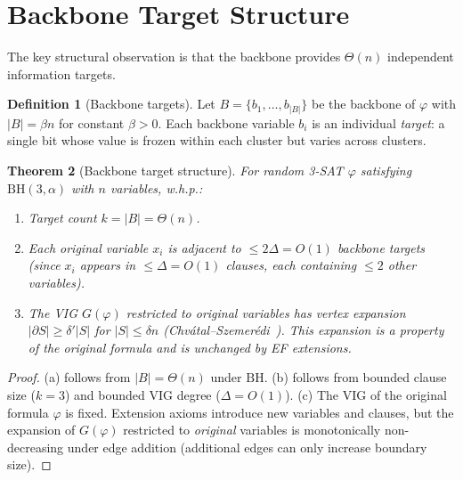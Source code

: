 \documentclass[11pt]{article}
\newtheorem{theorem}{Theorem}[section]
\theoremstyle{definition}
\newtheorem{definition}[theorem]{Definition}
\begin{document}
\section{Backbone Target Structure}\label{sec:targets}

The key structural observation is that the backbone provides
$\Theta(n)$ independent information targets.

\begin{definition}[Backbone targets]\label{def:blocks-sec3}
Let $B = \{b_1, \ldots, b_{|B|}\}$ be the backbone of $\varphi$ with
$|B| = \beta n$ for constant $\beta > 0$.  Each backbone variable
$b_i$ is an individual \emph{target}: a single bit whose value is
frozen within each cluster but varies across clusters.
\end{definition}

\begin{theorem}[Backbone target structure]\label{thm:ldpc}
For random 3-SAT $\varphi$ satisfying $\mathrm{BH}(3, \alpha)$
with $n$ variables, w.h.p.:
\begin{enumerate}[label=(\alph*)]
\item Target count $k = |B| = \Theta(n)$.
\item Each original variable $x_i$ is \emph{adjacent} to
$\leq 2\Delta = O(1)$ backbone targets (since $x_i$ appears in
$\leq \Delta = O(1)$ clauses, each containing $\leq 2$ other
variables).
\item The VIG $G(\varphi)$ restricted to original variables has vertex
expansion $|\partial S| \geq \delta' |S|$ for $|S| \leq \delta n$
(Chv\'{a}tal--Szemer\'{e}di~\cite{Chvatal1988}).  This expansion is a
property of the original formula and is unchanged by EF extensions.
\end{enumerate}
\end{theorem}

\begin{proof}
(a) follows from $|B| = \Theta(n)$ under $\mathrm{BH}$.
(b) follows from bounded clause size ($k = 3$) and bounded VIG degree
($\Delta = O(1)$).
(c) The VIG of the original formula $\varphi$ is fixed.  Extension
axioms introduce new variables and clauses, but the expansion of
$G(\varphi)$ restricted to \emph{original} variables is monotonically
non-decreasing under edge addition (additional edges can only increase
boundary size).
\end{proof}
\end{document}
